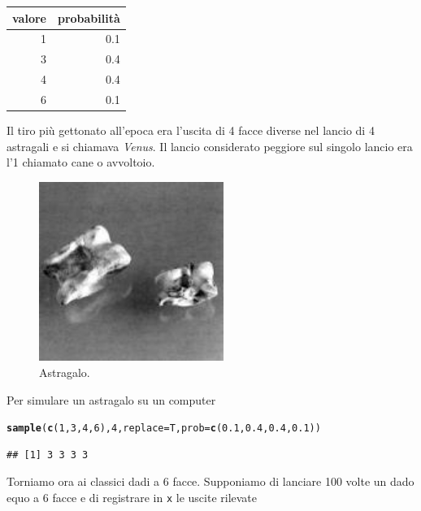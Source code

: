 \documentclass[onecolumn,12pt]{book}\usepackage[]{graphicx}\usepackage[]{color}
\makeatletter
\newcommand{\hlnum}[1]{\textcolor[rgb]{0.686,0.059,0.569}{#1}}%
\newcommand{\hlstd}[1]{\textcolor[rgb]{0.345,0.345,0.345}{#1}}%
\newcommand{\hlkwc}[1]{\textcolor[rgb]{0.333,0.667,0.333}{#1}}%
\newcommand{\hlkwd}[1]{\textcolor[rgb]{0.737,0.353,0.396}{\textbf{#1}}}%
\newenvironment{kframe}{%
 \def\at@end@of@kframe{}%
 \ifinner\ifhmode%
  \def\at@end@of@kframe{\end{minipage}}%
  \begin{minipage}{\columnwidth}%
 \fi\fi%
 \def\FrameCommand##1{\hskip\@totalleftmargin \hskip-\fboxsep
 \colorbox{shadecolor}{##1}\hskip-\fboxsep
     \hskip-\linewidth \hskip-\@totalleftmargin \hskip\columnwidth}%
 \MakeFramed {\advance\hsize-\width
   \@totalleftmargin\z@ \linewidth\hsize
   \@setminipage}}%
 {\par\unskip\endMakeFramed%
 \at@end@of@kframe}
\newenvironment{knitrout}{}{} %
\makeatother
\begin{document}
\begin{center}\begin{tabular}{|r|r |}
\hline
 valore&  probabilit\`a \\
\hline
1&0.1\\
3 &0.4\\
4& 0.4\\
6&0.1\\
 \hline
\end{tabular}
\end{center}
Il tiro pi\`u gettonato all'epoca era l'uscita di 4 facce diverse nel lancio di 4 astragali e si chiamava {\it Venus}.
Il lancio considerato peggiore sul singolo lancio era l'1 chiamato cane o avvoltoio.
\begin{figure}[htbp]
\begin{center}
\includegraphics[width=6cm]{../grafici/astragals.jpeg}
\caption{ Astragalo. }
\label{fig:astragalo}
\end{center}
\end{figure}
Per simulare un astragalo su un computer
\begin{knitrout}
\color{fgcolor}\begin{kframe}
\begin{alltt}
\hlkwd{sample}\hlstd{(}\hlkwd{c}\hlstd{(}\hlnum{1}\hlstd{,}\hlnum{3}\hlstd{,}\hlnum{4}\hlstd{,}\hlnum{6}\hlstd{),}\hlnum{4}\hlstd{,}\hlkwc{replace}\hlstd{=T,}\hlkwc{prob}\hlstd{=}\hlkwd{c}\hlstd{(}\hlnum{0.1}\hlstd{,}\hlnum{0.4}\hlstd{,}\hlnum{0.4}\hlstd{,}\hlnum{0.1}\hlstd{))}
\end{alltt}
\begin{verbatim}
## [1] 3 3 3 3
\end{verbatim}
\end{kframe}
\end{knitrout}

Torniamo ora ai classici dadi a 6 facce.
Supponiamo di lanciare 100 volte un dado equo a 6 facce e di registrare in \texttt{x}
le uscite rilevate
\end{document}
